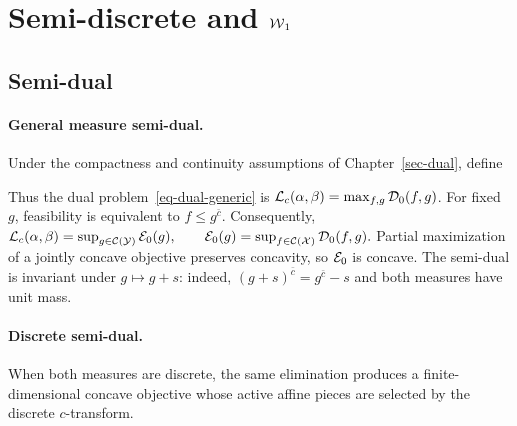 \section{\texorpdfstring{Semi-discrete and $\operatorname{\mathcal{W}}_1$}{Semi-discrete and W1}}
\label{sec-semidiscr-w1}
\subsection{Semi-dual}\label{sec-semi-dual}
\paragraph{General measure semi-dual.}
\begin{defn}\label{def-full-dual-functional}
Under the compactness and continuity assumptions of Chapter~\ref{sec-dual}, define
\end{defn}
Thus the dual problem~\eqref{eq-dual-generic} is $\mathcal{L}_c(\alpha,\beta)=\max_{f,g}\mathcal{D}_0(f,g)$. For fixed $g$, feasibility is equivalent to $f\leq g^{\bar c}$. Consequently,
\(\mathcal{L}_c(\alpha,\beta) = \sup_{g\in\mathcal{C}(\mathcal{Y})}\mathcal{E}_0(g), \qquad \mathcal{E}_0(g)=\sup_{f\in\mathcal{C}(\mathcal{X})}\mathcal{D}_0(f,g).\)
Partial maximization of a jointly concave objective preserves concavity, so $\mathcal{E}_0$ is concave. The semi-dual is invariant under $g\mapsto g+s$: indeed, $(g+s)^{\bar c}=g^{\bar c}-s$ and both measures have unit mass.

\paragraph{Discrete semi-dual.}
When both measures are discrete, the same elimination produces a finite-dimensional concave objective whose active affine pieces are selected by the discrete $c$-transform.

